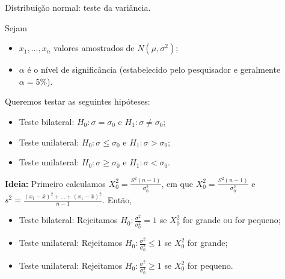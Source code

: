 \documentclass[8pt]{beamer}
\begin{document}
\begin{frame}{Distribuição normal: teste da variância.}

\normalsize

Sejam
\begin{itemize}
	\item $x_1, \dots, x_n$ valores amostrados de $N(\mu, \sigma^2)$;
	\item $\alpha$ é o nível de significância (estabelecido pelo pesquisador e geralmente $\alpha=5\%$). 
\end{itemize}
\vfill

Queremos testar as seguintes hipóteses:
\begin{itemize}
	\item Teste bilateral: $H_0: \sigma= \sigma_0$ e $H_1: \sigma \neq \sigma_0$;
	\item Teste unilateral: $H_0: \sigma \leq \sigma_0$ e $H_1: \sigma > \sigma_0$;
	\item Teste unilateral: $H_0: \sigma \geq \sigma_0$ e $H_1: \sigma < \sigma_0$.
\end{itemize}
\vfill

\textbf{Ideia:} Primeiro calculamos $X_0^2=\frac{S^2 (n-1)}{\sigma_0^2}$, em que $X_0^2 = \frac{S^2 (n-1)}{\sigma_0^2}$ e $s^2=\frac{(x_1-\bar{x})^2 + \dots + (x_1-\bar{x})^2}{n-1}$. Então, 
\begin{itemize}
	\item Teste bilateral: Rejeitamos $H_0: \frac{\sigma^2}{\sigma_0^2} =1$ se $ X_0^2 $ for grande ou for pequeno;
	\item Teste unilateral: Rejeitamos $H_0: \frac{\sigma^2}{\sigma_0^2}\leq 1$ se $X_0^2 $ for grande;
	\item Teste unilateral: Rejeitamos $H_0: \frac{\sigma^2}{\sigma_0^2}\geq 1$ se $X_0^2 $ for pequeno.
\end{itemize}

\end{frame}
\end{document}
